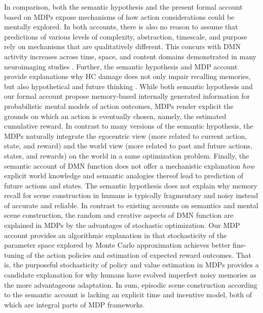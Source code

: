 \documentclass[10pt,letterpaper]{article}
\begin{document}
In comparison,
both the semantic hypothesis and the present formal account based on MDPs
expose mechanisms of how action considerations could be mentally explored.
In both accounts,
there is also no reason to assume that predictions of various
levels of complexity, abstraction, timescale, and purpose
rely on mechanisms that are qualitatively different. This concurs with
DMN activity increases across time, space, and content domains
demonstrated in many neuroimaging studies
\citep{spreng2009common, laird2009, bzdok2012morality, binder2009}.
Further, the semantic hypothesis
and MDP account provide explanations why HC damage does
not only impair recalling memories, but also hypothetical and future
thinking \citep{hassabis2007patients}.
While both semantic hypothesis and
our formal account propose memory-based internally
generated information for probabilistic mental models of action outcomes,
MDPs render explicit the grounds on which an action is
eventually chosen, namely, the estimated cumulative reward.
In contrast to many versions of the semantic hypothesis,
the MDPs naturally integrate the egocentric view
(more related to current action, state, and reward) and the
world view (more related to past and future actions, states, and rewards)
on the world in a same optimization problem.
Finally,
the semantic account of DMN function does not offer
a mechanistic explanation \textit{how}
explicit world knowledge and semantic analogies thereof
lead to prediction of future actions and states.
The semantic hypothesis does not explain why memory recall
for scene construction in humans is typically fragmentary and noisy
instead of accurate and reliable.
In contrast to existing accounts on semantics and
mental scene construction, the random and creative aspects of DMN function
are explained in MDPs by the advantages of stochastic optimization.
Our MDP account provides an algorithmic explanation in that
stochasticity of the parameter space explored
by Monte Carlo approximation achieves better fine-tuning of the
action policies and estimation of expected reward outcomes.
That is, the purposeful stochasticity of policy and value estimation
in MDPs provides a candidate explanation for why humans
have evolved imperfect noisy memories
as the more advantageous adaptation.
In sum, episodic scene construction according to the semantic
account is lacking an explicit time and incentive model,
both of which are integral parts of MDP frameworks.
\end{document}
